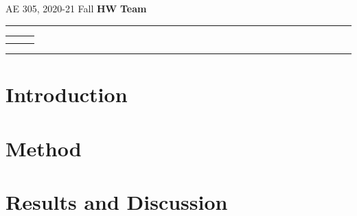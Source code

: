 \documentclass[letterpaper,12pt]{article}
\begin{document}
\begin{center}
AE 305, 2020-21 Fall \hfill \textbf{HW \HWno} \hfill \textbf{Team \TeamNo} \\
\noindent\rule{\textwidth}{0.4pt}
\begin{tabular}{p{} | p{} | p{} }
	\AuthorOneName&\AuthorTwoName&\AuthorThreeName\\
	\textit{\AuthorOneID}&\textit{\AuthorTwoID}&\textit{\AuthorThreeID}
\end{tabular}
\noindent\rule{\textwidth}{0.4pt}
\end{center}


\section{Introduction}


\section{Method}

\newpage

\section{Results and Discussion}
\end{document}
